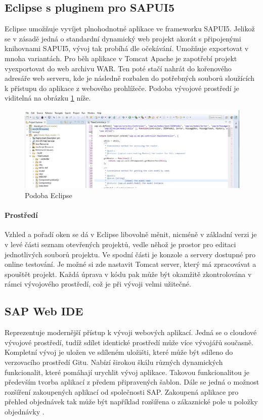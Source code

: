 \documentclass[thesis=M,czech]{FITthesis}[2012/06/26]
\begin{document}
\subsection{Eclipse s pluginem pro SAPUI5}
\label{ssec:eclipse_sapui5}
Eclipse umožňuje vyvíjet plnohodnotné aplikace ve frameworku SAPUI5. Jelikož se v zásadě jedná o standardní dynamický web projekt akorát s připojenými knihovnami SAPUI5, vývoj tak probíhá dle očekávání. Umožňuje exportovat v mnoha variantách. Pro běh aplikace v Tomcat Apache je zapotřebí projekt vyexportovat do web archivu WAR. Ten poté stačí nahrát do kořenového adresáře web serveru, kde je následně rozbalen do potřebných souborů sloužících k přístupu do aplikace z webového prohlížeče. Podoba vývojové prostředí je viditelná na obrázku \ref{img:eclipse_design} níže. 
\begin{figure}[H]
	\centering
	\includegraphics[width=1\textwidth]{images/eclipse_design}
	\caption{Podoba Eclipse}
	\label{img:eclipse_design}
\end{figure}
\paragraph{Prostředí} 
Vzhled a pořadí oken se dá v Eclipse libovolně měnit, nicméně v základní verzi je v levé části seznam otevřených projektů, vedle něhož je prostor pro editaci jednotlivých souborů projektu. Ve spodní části je konzole a servery dostupné pro online testování. Je možné si zde nastavit Tomcat server, který má zpracovávat a spouštět projekt. Každá úprava v kódu pak může být okamžitě zkontrolována v rámci vývojového prostředí, což je při vývoji velmi užitečné. 

\subsection{SAP Web IDE}
\label{ssec:sap_web_ide}
Reprezentuje modernější přístup k vývoji webových aplikací. Jedná se o cloudové vývojové prostředí, tudíž sdílet identické prostředí může více vývojářů současně. Kompletní vývoj je uložen ve sdíleném uložišti, které může být sdíleno do verzovacího prostředí Gitu. Nabízí širokou škálu různých dynamických funkcionalit, které pomáhají urychlit vývoj aplikace. Takovou funkcionalitou je především tvorba aplikací z předem připravených šablon. Dále se jedná o možnost rozšíření zakoupených aplikací od společnosti SAP. Zakoupená aplikace pro přehled objednávek tak může být například rozšířena o zákaznické pole u položky objednávky \cite{webide}.
\end{document}
